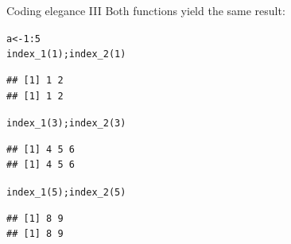 \documentclass[xcolor=table,           xcolor=dvipsnames]{beamer}\usepackage[]{graphicx}\usepackage[]{color}
\makeatletter
\newcommand{\hlnum}[1]{\textcolor[rgb]{0,0,0}{#1}}
\newcommand{\hlopt}[1]{\textcolor[rgb]{0,0,0}{#1}}
\newcommand{\hlstd}[1]{\textcolor[rgb]{0,0,0}{#1}}
\newcommand{\hlkwb}[1]{\textcolor[rgb]{0,0,0}{#1}}
\newcommand{\hlkwd}[1]{\textcolor[rgb]{0,0,1}{#1}}
\newenvironment{kframe}{%
 \def\at@end@of@kframe{}%
 \ifinner\ifhmode%
  \def\at@end@of@kframe{\end{minipage}}%
  \begin{minipage}{\columnwidth}%
 \fi\fi%
 \def\FrameCommand##1{\hskip\@totalleftmargin \hskip-\fboxsep
 \colorbox{shadecolor}{##1}\hskip-\fboxsep
     \hskip-\linewidth \hskip-\@totalleftmargin \hskip\columnwidth}%
 \MakeFramed {\advance\hsize-\width
   \@totalleftmargin\z@ \linewidth\hsize
   \@setminipage}}%
 {\par\unskip\endMakeFramed%
 \at@end@of@kframe}
\newenvironment{knitrout}{}{} %
\makeatother
\begin{document}
\begin{frame}[fragile]{Coding elegance III}
Both functions yield the same result:
\begin{knitrout}\small
{}\color{fgcolor}\begin{kframe}
\begin{alltt}
\hlstd{a} \hlkwb{<-} \hlnum{1}\hlopt{:}\hlnum{5}
\hlkwd{index_1}\hlstd{(}\hlnum{1}\hlstd{);} \hlkwd{index_2}\hlstd{(}\hlnum{1}\hlstd{)}
\end{alltt}
\begin{verbatim}
## [1] 1 2
## [1] 1 2
\end{verbatim}
\begin{alltt}
\hlkwd{index_1}\hlstd{(}\hlnum{3}\hlstd{);} \hlkwd{index_2}\hlstd{(}\hlnum{3}\hlstd{)}
\end{alltt}
\begin{verbatim}
## [1] 4 5 6
## [1] 4 5 6
\end{verbatim}
\begin{alltt}
\hlkwd{index_1}\hlstd{(}\hlnum{5}\hlstd{);} \hlkwd{index_2}\hlstd{(}\hlnum{5}\hlstd{)}
\end{alltt}
\begin{verbatim}
## [1] 8 9
## [1] 8 9
\end{verbatim}
\end{kframe}
\end{knitrout}
\end{frame}


\end{document}
